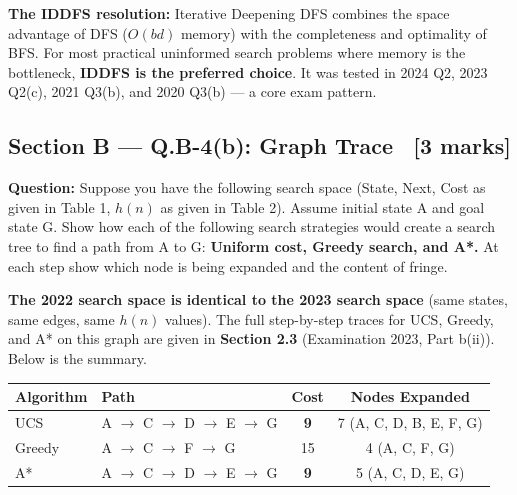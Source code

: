 \documentclass[12pt, a4paper]{article}
\newenvironment{solutionbox}{\begin{mdframed}[style=solutionframe]}{\end{mdframed}}
\newenvironment{notesbox}{\begin{mdframed}[style=notesframe]}{\end{mdframed}}
\begin{document}
\begin{notesbox}
\textbf{The IDDFS resolution:} Iterative Deepening DFS combines the space advantage of DFS ($O(bd)$ memory) with the completeness and optimality of BFS. For most practical uninformed search problems where memory is the bottleneck, \textbf{IDDFS is the preferred choice}. It was tested in 2024 Q2, 2023 Q2(c), 2021 Q3(b), and 2020 Q3(b) — a core exam pattern.
\end{notesbox}

\subsection{Section B — Q.B-4(b): Graph Trace \ [3 marks]}

\begin{solutionbox}
\textbf{Question:} Suppose you have the following search space (State, Next, Cost as given in Table 1, $h(n)$ as given in Table 2). Assume initial state A and goal state G. Show how each of the following search strategies would create a search tree to find a path from A to G: \textbf{Uniform cost, Greedy search, and A*.} At each step show which node is being expanded and the content of fringe.
\end{solutionbox}

\vspace{0.6em}

\noindent\textbf{The 2022 search space is identical to the 2023 search space} (same states, same edges, same $h(n)$ values). The full step-by-step traces for UCS, Greedy, and A* on this graph are given in \textbf{Section 2.3} (Examination 2023, Part b(ii)). Below is the summary.

\vspace{0.4em}
\begin{center}
\renewcommand{\arraystretch}{1.3}
\begin{tabular}{l|l|c|c}
\toprule
\textbf{Algorithm} & \textbf{Path} & \textbf{Cost} & \textbf{Nodes Expanded} \\
\midrule
UCS    & A $\to$ C $\to$ D $\to$ E $\to$ G & \textbf{9} & 7 (A, C, D, B, E, F, G) \\
Greedy & A $\to$ C $\to$ F $\to$ G          & 15 & 4 (A, C, F, G) \\
A*     & A $\to$ C $\to$ D $\to$ E $\to$ G & \textbf{9} & 5 (A, C, D, E, G) \\
\bottomrule
\end{tabular}
\end{center}
\end{document}
